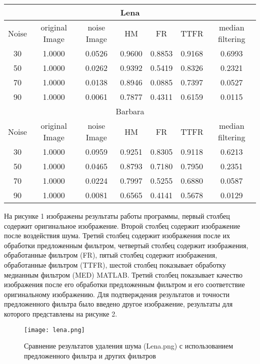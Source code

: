 \begin{table}[H]
    \centering
    \begin{tabular}{ccccccc}
        \hline
        \multicolumn{7}{c}{Lena} \\
        \hline
        Noise & original Image & noise Image & HM & FR & TTFR & median filtering \\
        30 & 1.0000 & 0.0526 & 0.9600 & 0.8853 & 0.9168 & 0.6993 \\
        50 & 1.0000 & 0.0262 & 0.9392 & 0.5419 & 0.8326 & 0.2321 \\
        70 & 1.0000 & 0.0138 & 0.8946 & 0.0885 & 0.7397 & 0.0527 \\
        90 & 1.0000 & 0.0061 & 0.7877 & 0.4311 & 0.6159 & 0.0115 \\
        \multicolumn{7}{c}{Barbara} \\
        Noise & original Image & noise Image & HM & FR & TTFR & median filtering \\
        30 & 1.0000 & 0.0959 & 0.9251 & 0.8305 & 0.9118 & 0.6213 \\
        50 & 1.0000 & 0.0465 & 0.8793 & 0.7180 & 0.7950 & 0.2351 \\
        70 & 1.0000 & 0.0224 & 0.7997 & 0.5255 & 0.6880 & 0.0587 \\
        90 & 1.0000 & 0.0081 & 0.6565 & 0.4141 & 0.5678 & 0.0129 \\
        \hline
    \end{tabular}
    \caption{}
\end{table}

На рисунке 1 изображены результаты работы программы, первый столбец содержит
оригинальное изображение. Второй столбец содержит изображение после воздействия
шума. Третий столбец содержит изображения после их обработки предложенным
фильтром, четвертый столбец содержит изображения, обработанные фильтром (FR),
пятый столбец содержит изображения, обработанные фильтром (TTFR), шестой столбец
показывает обработку медианным фильтром (MED) MATLAB. Третий столбец показывает
качество изображения после его обработки предложенным фильтром и его
соответствие оригинальному изображению. Для подтверждения результатов и точности
предложенного фильтра было введено другое изображение, результаты для которого
представлены на рисунке 2.

\begin{figure}[H]
    \centering
    \texttt{[image: lena.png]}
    \caption{Сравнение результатов удаления шума (Lena.png) 
    с использованием предложенного фильтра и других фильтров}
\end{figure}

